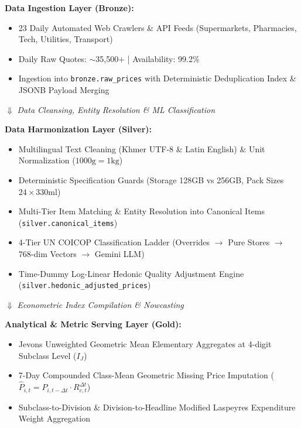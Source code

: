 \documentclass[11pt,a4paper]{article}
\begin{document}
\begin{center}
\begin{tcolorbox}[colback=white,colframe=NavyBlue,width=\textwidth,title=\bfseries End-to-End Pipeline Data Flow]
\small
\textbf{Data Ingestion Layer (Bronze):}
\begin{itemize}[noitemsep]
    \item 23 Daily Automated Web Crawlers \& API Feeds (Supermarkets, Pharmacies, Tech, Utilities, Transport)
    \item Daily Raw Quotes: $\sim$35,500+ | Availability: 99.2\%
    \item Ingestion into \texttt{bronze.raw\_prices} with Deterministic Deduplication Index \& JSONB Payload Merging
\end{itemize}
\centering $\Downarrow$ \textit{Data Cleansing, Entity Resolution \& ML Classification} \\
\raggedright
\textbf{Data Harmonization Layer (Silver):}
\begin{itemize}[noitemsep]
    \item Multilingual Text Cleaning (Khmer UTF-8 \& Latin English) \& Unit Normalization ($1000\text{g} = 1\text{kg}$)
    \item Deterministic Specification Guards (Storage 128GB vs 256GB, Pack Sizes $24\times 330\text{ml}$)
    \item Multi-Tier Item Matching \& Entity Resolution into Canonical Items (\texttt{silver.canonical\_items})
    \item 4-Tier UN COICOP Classification Ladder (Overrides $\rightarrow$ Pure Stores $\rightarrow$ 768-dim Vectors $\rightarrow$ Gemini LLM)
    \item Time-Dummy Log-Linear Hedonic Quality Adjustment Engine (\texttt{silver.hedonic\_adjusted\_prices})
\end{itemize}
\centering $\Downarrow$ \textit{Econometric Index Compilation \& Nowcasting} \\
\raggedright
\textbf{Analytical \& Metric Serving Layer (Gold):}
\begin{itemize}[noitemsep]
    \item Jevons Unweighted Geometric Mean Elementary Aggregates at 4-digit Subclass Level ($I_J$)
    \item 7-Day Compounded Class-Mean Geometric Missing Price Imputation ($\widehat{P}_{i,t} = P_{i,t-\Delta t} \cdot R_{c,t}^{\Delta t}$)
    \item Subclass-to-Division \& Division-to-Headline Modified Laspeyres Expenditure Weight Aggregation

\end{itemize}
\end{tcolorbox}
\end{center}
\end{document}
